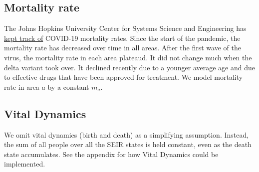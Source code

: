 \documentclass{article}
\begin{document}
    \subsection{Mortality rate} 
    The Johns Hopkins University Center for Systems Science and Engineering has \href{https://ourworldindata.org/mortality-risk-covid}{kept track of} COVID-19 mortality rates. Since the start of the pandemic, the mortality rate has decreased over time in all areas. After the first wave of the virus, the mortality rate in each area plateaud. It did not change much when the delta variant took over. It declined recently due to a younger average age and due to effective drugs that have been approved for treatment. We model mortality rate in area $a$ by a constant $m_{a}$.
    \subsection{Vital Dynamics} We omit vital dynamics (birth and death) as a simplifying assumption.     Instead, the sum of all people over all the SEIR states is held constant, even as the death state accumulates. See the appendix for how Vital Dynamics could be implemented.

   

%         
\end{document}
